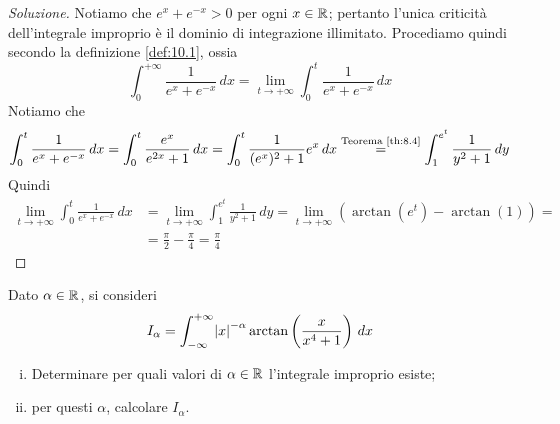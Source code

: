 \begin{proof}[Soluzione]
    Notiamo che $e^x+e^{-x}>0$ per ogni $x\in\amsbb{R}$; pertanto l'unica criticità dell'integrale improprio è il dominio di integrazione illimitato. Procediamo quindi secondo la definizione \ref{def:10.1}, ossia
    \[
    \int_0^{+\infty} \frac{1}{e^x+e^{-x}}\, dx = \lim_{t\to +\infty} \int_0^t \frac{1}{e^x + e^{-x}}\, dx 
    \]
    Notiamo che
    \[
    \int_0^t \frac{1}{e^x+e^{-x}}\, dx = \int_0^{t}\frac{e^x}{e^{2x}+1}\, dx = \int_0^t \frac{1}{(e^x)^2+1}e^x\, dx \overset{\text{Teorema \ref{th:8.4}}}{=} \int_1^{e^t} \frac{1}{y^2+1}\, dy
    \]
    Quindi
    \[
    \begin{split}
        \lim_{t\to +\infty} \int_0^t \frac{1}{e^x+e^{-x}}\, dx &= \lim_{t\to +\infty} \int_1^{e^t} \frac{1}{y^2+1}\, dy = \lim_{t\to +\infty} \left(\arctan(e^t)-\arctan(1)\right) = \\
        & = \frac{\pi}{2}-\frac{\pi}{4} = \frac{\pi}{4}
    \end{split}
    \]
\end{proof}
\begin{exercise}
    \label{ex:10.4}
    Dato $\alpha\in\amsbb{R}$, si consideri
    \[
    I_\alpha = \int_{-\infty}^{+\infty} \abs{x}^{-\alpha}\arctan\left(\frac{x}{x^4+1}\right)\, dx
    \]
    \begin{enumerate}[(i)]
        \item Determinare per quali valori di $\alpha\in\amsbb{R}$ l'integrale improprio esiste;
        \item per questi $\alpha$, calcolare $I_\alpha$.
    \end{enumerate}
\end{exercise}
